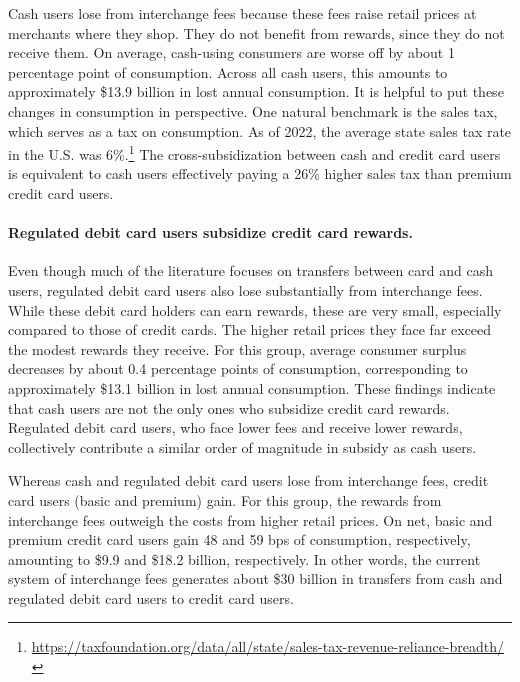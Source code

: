 \documentclass[11pt,english]{article}
\theoremstyle{remark}
\begin{document}
Cash users lose from interchange fees because these fees raise retail prices at merchants where they shop.
They do not benefit from rewards, since they do not receive them.
On average, cash-using consumers are worse off by about 1 percentage point of consumption.
Across all cash users, this amounts to approximately \$13.9 billion in lost annual consumption.
It is helpful to put these changes in consumption in perspective.
One natural benchmark is the sales tax, which serves as a tax on consumption.
As of 2022, the average state sales tax rate in the U.S. was 6\%.\footnote{\url{https://taxfoundation.org/data/all/state/sales-tax-revenue-reliance-breadth/}} The cross-subsidization between cash and credit card users is equivalent to cash users effectively paying a 26\% higher sales tax than premium credit card users.

\paragraph{Regulated debit card users subsidize credit card rewards.}

Even though much of the literature focuses on transfers between card and cash users, regulated debit card users also lose substantially from interchange fees.
While these debit card holders can earn rewards, these are very small, especially compared to those of credit cards.
The higher retail prices they face far exceed the modest rewards they receive. For this group, average consumer surplus decreases by about 0.4 percentage points of consumption, corresponding to approximately \$13.1 billion in lost annual consumption.
These findings indicate that cash users are not the only ones who subsidize credit card rewards.
Regulated debit card users, who face lower fees and receive lower rewards, collectively contribute a similar order of magnitude in subsidy as cash users.

Whereas cash and regulated debit card users lose from interchange fees, credit card users (basic and premium) gain.
For this group, the rewards from interchange fees outweigh the costs from higher retail prices.
On net, basic and premium credit card users gain 48 and 59 bps of consumption, respectively, amounting to \$9.9 and \$18.2 billion, respectively.
In other words, the current system of interchange fees generates about \$30 billion in transfers from cash and regulated debit card users to credit card users.
\end{document}
